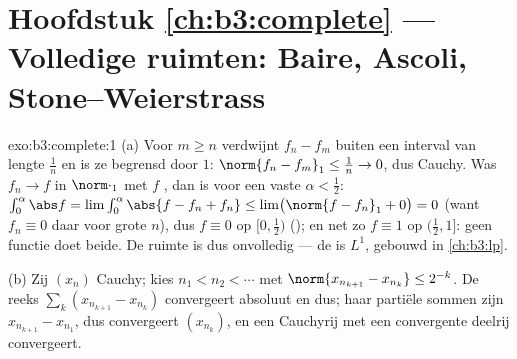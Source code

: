 \section*{Hoofdstuk \ref{ch:b3:complete} --- Volledige ruimten:
Baire, Ascoli, Stone--Weierstrass}

\begin{solution}{exo:b3:complete:1}
(a) Voor $m \geq n$ verdwijnt $f_n - f_m$ buiten een interval van
lengte $\frac1n$ en is ze begrensd door $1$: $\norm{f_n - f_m}_1
\leq \frac1n \to 0$, dus Cauchy. Was $f_n \to f$ in
$\norm\cdot_1$ met $f$ , dan is voor een vaste $\alpha <
\frac12$: $\int_0^{\alpha}\abs f = \lim \int_0^\alpha\abs{f - f_n
+ f_n} \leq \lim\bigl(\norm{f - f_n}_1 + 0\bigr) = 0$ (want $f_n
\equiv 0$ daar voor grote $n$), dus $f \equiv 0$ op $[0,
\frac12)$ (); en net zo $f \equiv 1$ op $(\frac12,
1]$: geen  functie doet beide. De ruimte is dus onvolledig
--- de  is $L^1$, gebouwd in
\cref{ch:b3:lp}.

(b) Zij $(x_n)$ Cauchy; kies $n_1 < n_2 < \cdots$ met
$\norm{x_{n_{k+1}} - x_{n_k}} \leq 2^{-k}$. De reeks $\sum_k
(x_{n_{k+1}} - x_{n_k})$ convergeert absoluut en dus; haar
partiële sommen zijn $x_{n_{k+1}} - x_{n_1}$, dus convergeert
$(x_{n_k})$, en een Cauchyrij met een convergente deelrij
convergeert.
\end{solution}

